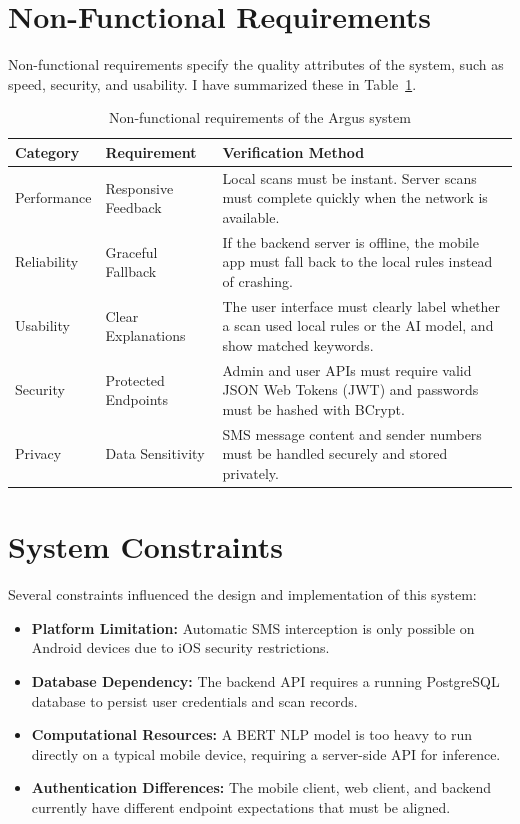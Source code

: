 \section{Non-Functional Requirements}
Non-functional requirements specify the quality attributes of the system, such as speed, security, and usability. I have summarized these in Table~\ref{tab:nonfunctional-requirements}.

\begin{table}[htbp]
  \centering
  \caption{Non-functional requirements of the Argus system}
  \label{tab:nonfunctional-requirements}
  \begin{tabularx}{\textwidth}{l p{} X}
    \toprule
    \textbf{Category} & \textbf{Requirement} & \textbf{Verification Method}\\
    \midrule
    Performance & Responsive Feedback & Local scans must be instant. Server scans must complete quickly when the network is available.\\
    Reliability & Graceful Fallback & If the backend server is offline, the mobile app must fall back to the local rules instead of crashing.\\
    Usability & Clear Explanations & The user interface must clearly label whether a scan used local rules or the AI model, and show matched keywords.\\
    Security & Protected Endpoints & Admin and user APIs must require valid JSON Web Tokens (JWT) and passwords must be hashed with BCrypt.\\
    Privacy & Data Sensitivity & SMS message content and sender numbers must be handled securely and stored privately.\\
    \bottomrule
  \end{tabularx}
\end{table}

\section{System Constraints}
Several constraints influenced the design and implementation of this system:
\begin{itemize}
  \item \textbf{Platform Limitation:} Automatic SMS interception is only possible on Android devices due to iOS security restrictions.
  \item \textbf{Database Dependency:} The backend API requires a running PostgreSQL database to persist user credentials and scan records.
  \item \textbf{Computational Resources:} A BERT NLP model is too heavy to run directly on a typical mobile device, requiring a server-side API for inference.
  \item \textbf{Authentication Differences:} The mobile client, web client, and backend currently have different endpoint expectations that must be aligned.
\end{itemize}

